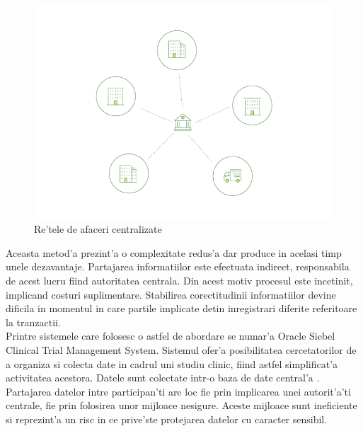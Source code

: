 \documentclass[12pt,a4paper,twoside]{report}
\begin{document}
		\begin{figure}[!ht]
		\begin{center}
			\includegraphics[scale=1.60]{img/current_network.png}
			\caption{Re'tele de afaceri centralizate\cite{fabricdoc}}
  			\label{fig:centralised}
  		\end{center}
  		\end{figure}
	Aceasta metod'a prezint'a o complexitate redus'a dar produce in acelasi timp unele dezavantaje. Partajarea informatiilor este efectuata indirect, responsabila de acest lucru fiind autoritatea centrala. Din acest motiv procesul este incetinit, implicand costuri suplimentare. Stabilirea corectitudinii informatiilor devine dificila in momentul in care partile implicate detin inregistrari diferite referitoare la tranzactii.\\
		Printre sistemele care folosesc o astfel de abordare se numar'a Oracle Siebel Clinical Trial Management System\cite{ctms}. Sistemul ofer'a posibilitatea cercetatorilor de a organiza si colecta date in cadrul uni studiu clinic, fiind astfel simplificat'a activitatea acestora. Datele sunt colectate intr-o baza de date central'a . Partajarea datelor intre participan'ti are loc fie prin implicarea unei autorit'a'ti centrale, fie prin folosirea unor mijloace nesigure. Aceste mijloace sunt ineficiente si reprezint'a un risc in ce prive'ste protejarea datelor cu caracter sensibil.\\	
\end{document}
